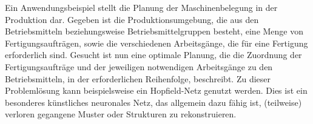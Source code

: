\documentclass[twoside,a4paper]{article}
\begin{document}
Ein Anwendungsbeispiel stellt die Planung der Maschinenbelegung in der Produktion dar. Gegeben ist die Produktionsumgebung, die aus den Betriebsmitteln beziehungsweise Betriebsmittelgruppen besteht, eine Menge von Fertigungsaufträgen, sowie die verschiedenen Arbeitsgänge, die für eine Fertigung erforderlich sind. Gesucht ist nun eine optimale Planung, die die Zuordnung der Fertigungsaufträge und der jeweiligen notwendigen Arbeitsgänge zu den Betriebsmitteln, in der erforderlichen Reihenfolge, beschreibt. Zu dieser Problemlösung kann beispielsweise ein Hopfield-Netz genutzt werden. Dies ist ein besonderes künstliches neuronales Netz, das allgemein dazu fähig ist, (teilweise) verloren gegangene Muster oder Strukturen zu rekonstruieren.
\end{document}
